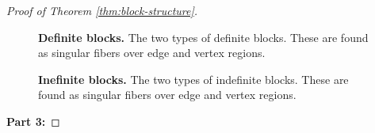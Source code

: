 \begin{proof}[Proof of Theorem \ref{thm:block-structure}]
	
	\begin{figure}[h!]
		\caption{
			\textbf{Definite blocks.}
			The two types of definite blocks.
			These are found as singular fibers over edge and vertex regions.
		}
		\label{fig:definite-blocks}
	\end{figure}

	\begin{figure}[h!]
	\caption{
		\textbf{Inefinite blocks.}
		The two types of indefinite blocks.
		These are found as singular fibers over edge and vertex regions.
	}
	\label{fig:indefinite-blocks}
	\end{figure}
	
	
	\textbf{Part 3:}
\end{proof}
